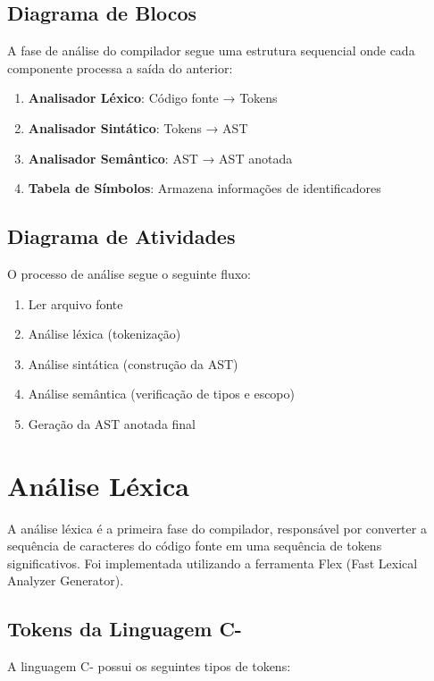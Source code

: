 \documentclass[
	12pt,				%
	oneside,
	a4paper,			%
	english,			%
	french,				%
	spanish,			%
	brazil,				%
	]{abntex2}
\begin{document}
\subsection{Diagrama de Blocos}

A fase de análise do compilador segue uma estrutura sequencial onde cada componente processa a saída do anterior:

\begin{enumerate}
    \item \textbf{Analisador Léxico}: Código fonte → Tokens
    \item \textbf{Analisador Sintático}: Tokens → AST
    \item \textbf{Analisador Semântico}: AST → AST anotada
    \item \textbf{Tabela de Símbolos}: Armazena informações de identificadores
\end{enumerate}

\subsection{Diagrama de Atividades}

O processo de análise segue o seguinte fluxo:
\begin{enumerate}
    \item Ler arquivo fonte
    \item Análise léxica (tokenização)
    \item Análise sintática (construção da AST)
    \item Análise semântica (verificação de tipos e escopo)
    \item Geração da AST anotada final
\end{enumerate}

\section{Análise Léxica}

A análise léxica é a primeira fase do compilador, responsável por converter a sequência de caracteres do código fonte em uma sequência de tokens significativos. Foi implementada utilizando a ferramenta Flex (Fast Lexical Analyzer Generator).

\subsection{Tokens da Linguagem C-}

A linguagem C- possui os seguintes tipos de tokens:
\end{document}
